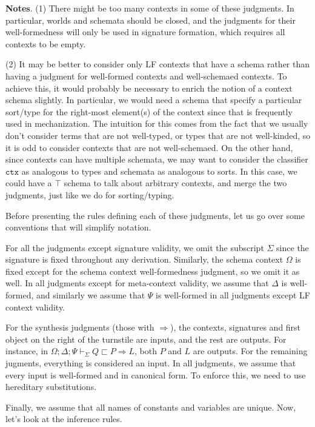 \documentclass[letterpaper, 11pt]{article}
\newcommand{\Rar}{\Rightarrow}
\begin{document}
    \textbf{Notes}. (1) There might be too many contexts in some of these judgments.  In particular, worlds and schemata should be closed, and the judgments
    for their well-formedness will only be used in signature formation, which requires all contexts to be empty.
    
    (2) It may be better to consider only LF contexts that have a schema rather than having a judgment for well-formed contexts and well-schemaed contexts.
    To achieve this, it would probably be necessary to enrich the notion of a context schema slightly.  In particular, we would need a schema that
    specify a particular sort/type for the right-most element(s) of the context since that is frequently used in mechanization.  The intuition for this
    comes from the fact that we usually don't consider terms that are not well-typed, or types that are not well-kinded, so it is odd to consider
    contexts that are not well-schemaed.  On the other hand, since contexts can have multiple schemata, we may want to consider the classifier 
    $\texttt{ctx}$ as analogous to types and schemata as analogous to sorts.  In this case, we could have a $\top$ schema to talk about arbitrary contexts,
    and merge the two judgments, just like we do for sorting/typing.

    Before presenting the rules defining each of these judgments, let us go over some conventions that will simplify notation.
    
    For all the judgments except signature validity, we omit the subscript $\Sigma$ since the signature is fixed throughout any derivation.
    Similarly, the schema context $\Omega$ is fixed except for the schema context well-formedness judgment, so we omit it as well.  In all judgments
    except for meta-context validity, we assume that $\Delta$ is well-formed, and similarly we assume that $\Psi$ is well-formed in all judgments
    except LF context validity.  

    For the synthesis judgments (those with $\Rar$), the contexts, signatures and first object on the right of the turnstile
    are inputs, and the rest are outputs.  For instance, in $\Omega; \Delta; \Psi \vdash_\Sigma Q \sqsubset P \Rar L$, both $P$ and $L$ are outputs.
    For the remaining jugments, everything is considered an input.  In all judgments, we assume that every input is well-formed and in canonical form.
    To enforce this, we need to use hereditary substitutions.

    Finally, we assume that all names of constants and variables are unique.  Now, let's look at the inference rules.
    
\end{document}
